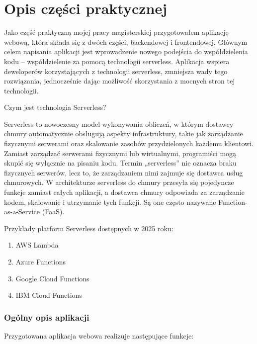 \documentclass[runningheads,12pt]{llncs}
\begin{document}

\section{Opis części praktycznej}

Jako część praktyczną mojej pracy magisterskiej przygotowałem aplikację webową, która składa się z dwóch części, backendowej i frontendowej.
Głównym celem napisania aplikacji jest wprowadzenie nowego podejścia do współdzielenia kodu – współdzielenie za pomocą technologii serverless. Aplikacja wspiera deweloperów korzystających z technologii serverless, zmniejsza wady tego rozwiązania, jednocześnie dając możliwość skorzystania z mocnych stron tej technologii.

Czym jest technologia Serverless?

Serverless to nowoczesny model wykonywania obliczeń, w którym dostawcy chmury automatycznie obsługują aspekty infrastruktury, takie jak zarządzanie fizycznymi serwerami oraz skalowanie zasobów przydzielonych każdemu klientowi. Zamiast zarządzać serwerami fizycznymi lub wirtualnymi, programiści mogą skupić się wyłącznie na pisaniu kodu. Termin „serverless” nie oznacza braku fizycznych serwerów, lecz to, że zarządzaniem nimi zajmuje się dostawca usług chmurowych. W architekturze serverless do chmury przesyła się pojedyncze funkcje zamiast całych aplikacji, a dostawca chmury odpowiada za zarządzanie kodem, skalowanie i utrzymanie tych funkcji. Są one często nazywane Function-as-a-Service (FaaS).

Przykłady platform Serverless dostępnych w 2025 roku:

\begin{enumerate}
    \item AWS Lambda 
    \item Azure Functions 
    \item Google Cloud Functions 
    \item IBM Cloud Functions 
\end{enumerate}

\subsubsection{Ogólny opis aplikacji}

Przygotowana aplikacja webowa realizuje następujące funkcje:
\end{document}
